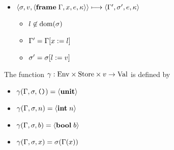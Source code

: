 \documentclass{article}
\begin{document}
\begin{minipage}{\textwidth}
\begin{minipage}[t]{0.50\textwidth}
\begin{itemize}
\item $\langle\sigma,v,\langle\mathbf{frame}\; \Gamma,x,e,\kappa\rangle\rangle \longmapsto \langle\Gamma',\sigma',e,\kappa\rangle$
\begin{itemize}
\item $l\not\in\operatorname{dom}(\sigma)$
\item $\Gamma' = \Gamma[x:= l]$
\item $\sigma' = \sigma[l:= v]$
\end{itemize}
\end{itemize}

The function $\gamma : \text{Env}\times \text{Store}\times v\to \text{Val}$ is defined by

\begin{itemize}
  \item $\gamma(\Gamma,\sigma,\text{\texttt{()}}) = \langle\mathbf{unit}\rangle$
  \item $\gamma(\Gamma,\sigma,n) = \langle\mathbf{int}\; n\rangle$
  \item $\gamma(\Gamma,\sigma,b) = \langle\mathbf{bool}\; b\rangle$
  \item $\gamma(\Gamma,\sigma,x) = \sigma(\Gamma(x))$
\end{itemize}

\end{minipage}
\end{minipage}
\end{document}
